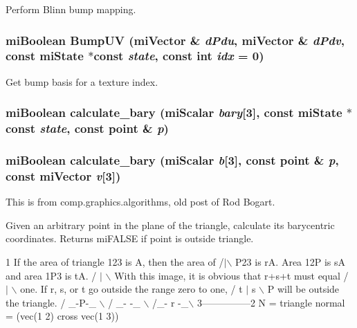 Perform Blinn bump mapping. 

\subsubsection{\setlength{\rightskip}{0pt plus 5cm}mi\-Boolean Bump\-UV (mi\-Vector \& {\em d\-Pdu}, mi\-Vector \& {\em d\-Pdv}, const mi\-State $\ast$const {\em state}, const int {\em idx} = 0)\hspace{0.3cm}{\tt  [static]}}\label{namespacemr_a51}


Get bump basis for a texture index. 

\subsubsection{\setlength{\rightskip}{0pt plus 5cm}mi\-Boolean calculate\_\-bary (mi\-Scalar {\em bary}[3], const mi\-State $\ast$const {\em state}, const point \& {\em p})\hspace{0.3cm}{\tt  [inline]}}\label{namespacemr_a28}


\subsubsection{\setlength{\rightskip}{0pt plus 5cm}mi\-Boolean calculate\_\-bary (mi\-Scalar {\em b}[3], const point \& {\em p}, const mi\-Vector {\em v}[3])\hspace{0.3cm}{\tt  [inline]}}\label{namespacemr_a27}


This is from comp.graphics.algorithms, old post of Rod Bogart.

Given an arbitrary point in the plane of the triangle, calculate its barycentric coordinates. Returns mi\-FALSE if point is outside triangle.

1 If the area of triangle 123 is A, then the area of /$|$$\backslash$ P23 is r\-A. Area 12P is s\-A and area 1P3 is t\-A. / $|$ $\backslash$ With this image, it is obvious that r+s+t must equal / $|$ $\backslash$ one. If r, s, or t go outside the range zero to one, / t $|$ s $\backslash$ P will be outside the triangle. / \_\--P-\_\- $\backslash$ / \_\-- -\_\- $\backslash$ /\_\-- r -\_\-$\backslash$ 3---------------2 N = triangle normal = (vec(1 2) cross vec(1 3))

